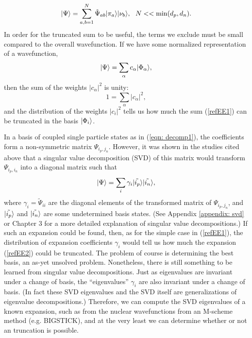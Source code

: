 \begin{equation}\label{eqn: decomptrunc}
|\Psi\rangle = \sum_{a,b = 1}^{N} \tilde{\Psi}_{ab}|\pi_a\rangle|\nu_b\rangle,\ \ N << \min(d_p,d_n).
\end{equation}
In order for the truncated sum to be useful, the terms we exclude must 
be small compared to the overall wavefunction. 
If we have some normalized representation of a wavefunction, 
\begin{equation}\label{refEE1}
    |\Psi\rangle = \sum_\alpha c_\alpha |\Phi_\alpha\rangle,
\end{equation}
then the sum of the weights $|c_\alpha|^2$ is unity:
\begin{equation}
    1 = \sum_\alpha|c_\alpha|^2,
\end{equation}
and the distribution of the weights $|c_i|^2$ tells us how much the sum (\ref{refEE1})
can be truncated in the basis ${|\Phi_i\rangle}$. 

In a basis of coupled single particle states as in (\ref{eqn: decomp1}), 
the coefficients form a non-symmetric matrix $\Psi_{i_p,j_n}$. However, it was shown in the
studies cited above\cite{Papenbrock03,Papenbrock04,Papenbrock05} that a singular value
decomposition\cite{NumRec} (SVD) of this matrix would transform $\Psi_{i_p,i_n}$ into a 
diagonal matrix such that
\begin{equation}\label{refEE2}
    |\Psi\rangle = \sum_i \gamma_i |\tilde{i_p}\rangle|\tilde{i_n}\rangle,
\end{equation}
where $\gamma_i=\tilde{\Psi}_{ii}$ are the diagonal elements of the transformed matrix of $\Psi_{i_p,j_n}$,
and $|\tilde{i_p}\rangle$ and $|\tilde{i_n}\rangle$ are some undetermined basis states.
(See Appendix \ref{appendix: svd} or Chapter 3 for a more detailed explanation of 
singular value decompositions.)
If such an expansion could be found, then, as for the simple case in (\ref{refEE1}),
the distribution of expansion coefficients $\gamma_i$ would tell us how much 
the expansion (\ref{refEE2}) could be truncated.
The problem of course is determining the best basis, an as-yet unsolved problem.
Nonetheless, there is still something to be learned from singular value decompositions.
Just as eigenvalues are invariant under a change of basis, the ``eigenvalues''
$\gamma_i$ are also invariant under a change of basis. (In fact these SVD eigenvalues
and the SVD itself are generalizations of eigenvalue decompositions.) Therefore,
we can compute the SVD eigenvalues of a known expansion, such as from the nuclear
wavefunctions from an M-scheme method (e.g. BIGSTICK), and at the very least
we can determine whether or not an truncation is possible.

